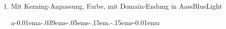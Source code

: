 \documentclass[
ngerman,
paper=a4,
oneside,
fontsize=9.5pt,
draft=false,
numbers=noenddot,
bibtotocnumbered,
footnotes=multiple,
]{scrbook}
\newcommand{\SizeTest}{\Huge}
\begin{document}
\begin{enumerate}
\begin{enumerate}
    \item Mit Kerning-Anpassung, Farbe, mit Domain-Endung in AassBlueLight
    
    
    {\SizeTest
    \vspace{1cm}
    {\color{AASSBlue}a\kern-0.01ema\kern-.039ems}{\color{AASSRed}\kern-.05ems}{\color{AASSBlueLight}\kern-.15em.\kern-.15eme\kern-0.01emu}
    \vspace{1cm}
    } %
    
    
    \bigskip
  \end{enumerate}







\end{enumerate}
\end{document}
